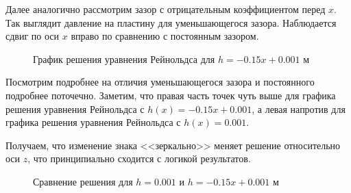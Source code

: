 \documentclass[a4paper,14pt]{extarticle}
\begin{document}
Далее аналогично рассмотрим зазор с отрицательным коэффициентом перед $x$. Так выглядит давление на пластину для уменьшающегося зазора. Наблюдается сдвиг по оси $x$ вправо по сравнению с постоянным зазором.

\begin{figure}[!htbp]
	\caption{График решения уравнения Рейнольдса для $h = -0.15 x + 0.001$ м}
	\label{res_neg}
\end{figure}

Посмотрим подробнее на отличия уменьшающегося зазора и постоянного подробнее поточечно. Заметим, что правая часть точек чуть выше для графика решения уравнения Рейнольдса с  $h(x) = -0.15x + 0.001$, а левая напротив для графика решения уравнения Рейнольдса с $h(x) = 0.001$.

Получаем, что изменение знака <<зеркально>> меняет решение относительно оси $z$, что принципиально сходится с логикой результатов.

\begin{figure}[!htbp]
	\caption{Сравнение решения для $h = 0.001$ и $h = -0.15 x + 0.001$ м}
	\label{neg_res_diff}
\end{figure}
\end{document}
